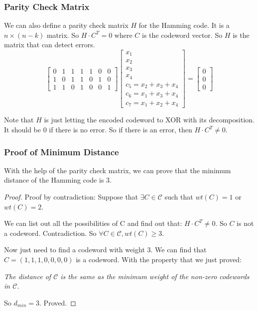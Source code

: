 \documentclass[letterpaper,12pt]{article}
\begin{document}
\subsubsection{Parity Check Matrix}
We can also define a parity check matrix $H$ for the Hamming code. It is a
$n\times (n-k)$ matrix. So $H\cdot C^T=0$ where $C$ is the codeword vector. So
$H$ is the matrix that can detect errors.
\[
    \begin{bmatrix}
        0 & 1 & 1 & 1 & 1 & 0 & 0 \\
        1 & 0 & 1 & 1 & 0 & 1 & 0 \\
        1 & 1 & 0 & 1 & 0 & 0 & 1
    \end{bmatrix}
    \begin{bmatrix}
        x_1               \\
        x_2               \\
        x_3               \\
        x_4               \\
        c_5 = x_2+x_3+x_4 \\
        c_6 = x_1+x_3+x_4 \\
        c_7 = x_1+x_2+x_4
    \end{bmatrix}
    =
    \begin{bmatrix}
        0 \\
        0 \\
        0
    \end{bmatrix}
\]

Note that $H$ is just letting the encoded codeword to XOR with its
decomposition. It should be 0 if there is no error. So if there is an error,
then $H\cdot C^T\neq 0$.

\subsubsection{Proof of Minimum Distance}
With the help of the parity check matrix, we can prove that the minimum
distance of the Hamming code is 3.\begin{proof}
    Proof by contradiction: Suppose that $\exists C \in \mathcal{C}$ such that $wt(C)=1$ or $wt(C)=2$.

    We can list out all the possibilities of C and find out that: $H\cdot C^T\neq
        0$. So $C$ is not a codeword. Contradiction. So $\forall C\in \mathcal{C},
        wt(C)\ge 3$.

    Now just need to find a codeword with weight 3. We can find that
    $C=(1,1,1,0,0,0,0)$ is a codeword. With the property that we just proved:

    \textit{The distance of $\mathcal{C}$ is the same as the minimum weight of the non-zero codewords in $\mathcal{C}$.}

    So $d_{min}=3$. Proved.
\end{proof}
\end{document}
